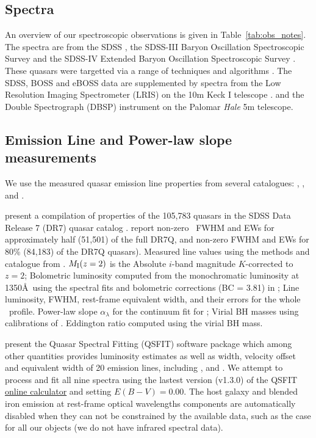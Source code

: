 \documentclass[a4paper,fleqn,usenatbib]{mnras}
\begin{document}
\subsection{Spectra}
An overview of our spectroscopic observations is given in
Table~\ref{tab:obs_notes}.  The spectra are from the SDSS
\citep{Stoughton2002, DR7, Schneider2010}, the SDSS-III Baryon
Oscillation Spectroscopic Survey \citep[BOSS][]{Eisenstein2011,
Dawson2013, Smee2013, Alam2015, Paris2017} and the SDSS-IV Extended
Baryon Oscillation Spectroscopic Survey \citep[eBOSS; ][]{Dawson2016,
Abolfathi2018, Paris2018}.  These quasars were targetted via a range
of techniques and algorithms \citep[see ][]{Richards2002, Ross2012,
Myers2015}. The SDSS, BOSS and eBOSS data are supplemented by
spectra from the Low Resolution Imaging Spectrometer (LRIS) on the 10m
Keck {\sc I} telescope \citep{Oke1995}.  and the Double Spectrograph
(DBSP) instrument on the Palomar {\it Hale} 5m telescope.


\subsection{Emission Line and Power-law slope measurements}
We use the measured quasar emission line properties from several catalogues: 
\citet{Shen2011}, \citet{Hamann2017}, \citet{Kozlowski2017} and
\citet{Calderone2017}.

\citet{Shen2011} present a compilation of properties of the 105,783
quasars in the SDSS Data Release 7 (DR7) quasar catalog \citep[DR7Q;
][]{Schneider2007}. \citet{Shen2011} report non-zero \civ\ FWHM and
EWs for approximately half (51,501) of the full DR7Q, and non-zero
\mgii FWHM and EWs for 80\% (84,183) of the DR7Q quasars).
Measured line values using the methods and catalogue from
\citet{Shen2011}.  $M_{\rm I}(z=2)$ is the Absolute $i$-band magnitude
$K$-corrected to $z = 2$; Bolometric luminosity computed from the
monochromatic luminosity at 1350\AA\ using the spectral fits and
bolometric corrections (BC = 3.81) in \citet{Richards2006b}; Line
luminosity, FWHM, rest-frame equivalent width, and their errors for
the whole \civ\ profile.  Power-law slope $\alpha_{\lambda}$ for the
continuum fit for \civ; Virial BH masses using calibrations of
\citet{VestergaardPeterson2006}.  Eddington ratio computed using the
virial BH mass.


\citet{Calderone2017} present the Quasar Spectral Fitting (QSFIT)
software package which among other quantities provides luminosity
estimates as well as width, velocity offset and equivalent width of 20
emission lines, including \civ, \ciii and \mgii.  We attempt to process and fit
all nine spectra using the lastest version (v1.3.0) of the QSFIT
\href{https://qsfit.inaf.it/cat_1.30/onlinefit.php}{online calculator}
and setting $E(B-V)=0.00$.
The host galaxy and blended iron emission at rest-frame optical wavelengths components
are automatically disabled when they can not be constrained by the available data,
such as the case for all our objects (we do not have infrared spectral data).
\end{document}

